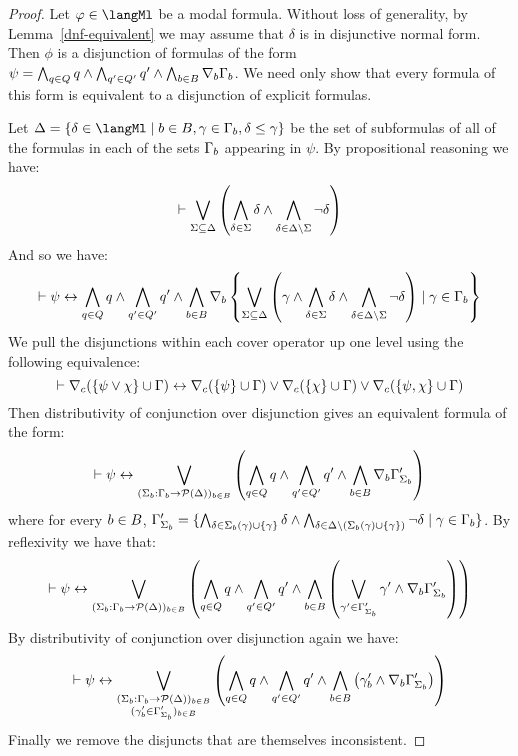 \begin{proof}
Let $\phi \in \langMl$ be a modal formula.
Without loss of generality, by Lemma~\ref{dnf-equivalent} we may assume that $\delta$ is in disjunctive normal form.
Then $\phi$ is a disjunction of formulas of the form $\psi = \bigwedge_{q \in Q} q \land \bigwedge_{q' \in Q'} q' \land \bigwedge_{b \in B} \nabla_{b} \Gamma_b$.
We need only show that every formula of this form is equivalent to a disjunction of explicit formulas.

Let $\Delta = \{\delta \in \langMl \mid \agentB \in \agentsB, \gamma \in \Gamma_\agentB, \delta \leq \gamma\}$ be the set of subformulas of all of the formulas in each of the sets $\Gamma_b$ appearing in $\psi$.
By propositional reasoning we have:
$$
\vdash \bigvee_{\Sigma \subseteq \Delta} \left( \bigwedge_{\delta \in \Sigma} \delta \land \bigwedge_{\delta \in \Delta \setminus \Sigma} \neg \delta \right) 
$$
And so we have:
$$
\vdash \psi \leftrightarrow \bigwedge_{q \in Q} q \land \bigwedge_{q' \in Q'} q' \land \bigwedge_{b \in B} \nabla_{b} \left\{ \bigvee_{\Sigma \subseteq \Delta} \left( \gamma \land \bigwedge_{\delta \in \Sigma} \delta \land \bigwedge_{\delta \in \Delta \setminus \Sigma} \neg \delta \right) \mid \gamma \in \Gamma_b \right\}
$$
We pull the disjunctions within each cover operator up one level using the following equivalence:
$$
\vdash \nabla_{c} (\{\psi \lor \chi\} \cup \Gamma) \leftrightarrow \nabla_{c} (\{\psi\} \cup \Gamma) \lor \nabla_{c} (\{\chi\} \cup \Gamma) \lor \nabla_{c} (\{\psi, \chi\} \cup \Gamma)
$$
Then distributivity of conjunction over disjunction gives an equivalent formula of the form:
$$
\vdash \psi \leftrightarrow
\bigvee_{(\Sigma_b : \Gamma_b \to \mathcal{P}(\Delta))_{b \in B}} \left( \bigwedge_{q \in Q} q \land \bigwedge_{q' \in Q'} q' \land \bigwedge_{b \in B} \nabla_{b} \Gamma'_{\Sigma_b} \right)
$$
where for every $b \in B$, $\Gamma'_{\Sigma_b} = \{\bigwedge_{\delta \in \Sigma_b(\gamma) \cup \{\gamma\}} \delta \land \bigwedge_{\delta \in \Delta \setminus (\Sigma_b(\gamma) \cup \{\gamma\})} \neg \delta \mid \gamma \in \Gamma_b\}$.
By reflexivity we have that:
$$
\vdash \psi \leftrightarrow
\bigvee_{(\Sigma_b : \Gamma_b \to \mathcal{P}(\Delta))_{b \in B}} \left( \bigwedge_{q \in Q} q \land \bigwedge_{q' \in Q'} q' \land \bigwedge_{b \in B} \left(\bigvee_{\gamma' \in \Gamma'_{\Sigma_b}} \gamma' \land \nabla_{b} \Gamma'_{\Sigma_b} \right) \right)
$$
By distributivity of conjunction over disjunction again we have:
$$
\vdash \psi \leftrightarrow
\bigvee_{\substack{(\Sigma_b : \Gamma_b \to \mathcal{P}(\Delta))_{b \in B}\\(\gamma'_b \in \Gamma'_{\Sigma_b})_{b \in B}}}
\left( \bigwedge_{q \in Q} q \land \bigwedge_{q' \in Q'} q' \land \bigwedge_{b \in B} \left(\gamma'_b \land \nabla_{b} \Gamma'_{\Sigma_b} \right) \right)
$$
Finally we remove the disjuncts that are themselves inconsistent.


\end{proof}
